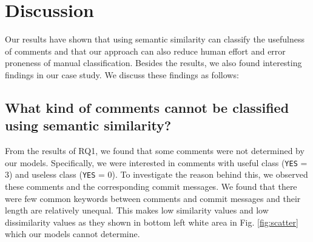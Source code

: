 \section{Discussion}
Our results have shown that using semantic similarity can classify the usefulness of comments
and that our approach can also reduce human effort and error proneness of manual classification.
Besides the results, we also found interesting findings in our case study.
We discuss these findings as follows:


\subsection{What kind of comments cannot be classified using semantic similarity?}

From the results of RQ1, we found that some comments were not determined by our models.
Specifically, we were interested in comments with useful class (\texttt{YES} = 3) and useless class (\texttt{YES} = 0).
To investigate the reason behind this, we observed these comments and the corresponding commit messages.
We found that there were few common keywords between comments and commit messages and their length are relatively unequal.
This makes low similarity values and low dissimilarity values as they shown in  bottom left white area in Fig. \ref{fig:scatter} which our models cannot determine.




